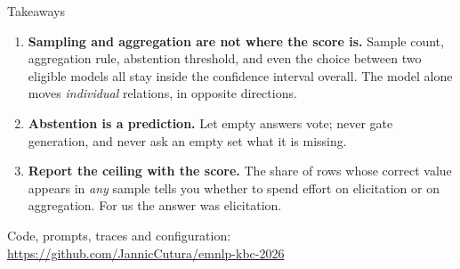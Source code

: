 \documentclass[aspectratio=169,10pt]{beamer}
\begin{document}
\begin{frame}{Takeaways}
  \begin{enumerate}
    \item \textbf{Sampling and aggregation are not where the score is.}
      Sample count, aggregation rule, abstention threshold, and even the choice
      between two eligible models all stay inside the confidence interval
      overall. The model alone moves \emph{individual} relations, in opposite
      directions.
    \item \textbf{Abstention is a prediction.} Let empty answers vote; never
      gate generation, and never ask an empty set what it is missing.
    \item \textbf{Report the ceiling with the score.} The share of rows whose
      correct value appears in \emph{any} sample tells you whether to spend
      effort on elicitation or on aggregation. For us the answer was
      elicitation.
  \end{enumerate}

  \vspace{5mm}
  \centering
  \small Code, prompts, traces and configuration:\\
  \url{https://github.com/JannicCutura/emnlp-kbc-2026}
\end{frame}
\end{document}
